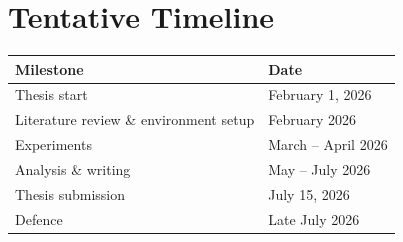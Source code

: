 \section{Tentative Timeline}

\centering
\begin{tabular}{@{}ll@{}}
\toprule
\textbf{Milestone} & \textbf{Date} \\
\midrule
Thesis start & February 1, 2026 \\
Literature review \& environment setup & February 2026 \\
Experiments & March -- April 2026 \\
Analysis \& writing & May -- July 2026 \\
Thesis submission & July 15, 2026 \\
Defence & Late July 2026 \\
\bottomrule
\end{tabular}
